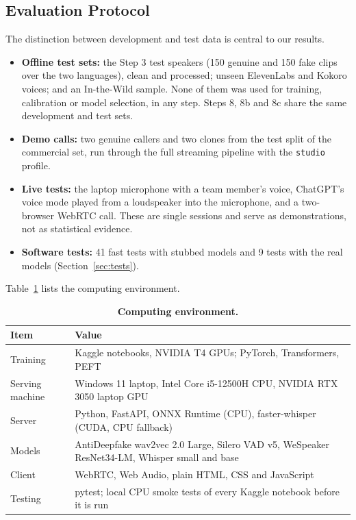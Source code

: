 \documentclass[10pt,a4paper,twocolumn]{article}
\begin{document}
\subsection{Evaluation Protocol}
The distinction between development and test data is central to our results.
\begin{itemize}\setlength\itemsep{0pt}
\item \textbf{Offline test sets:} the Step 3 test speakers (150 genuine and 150 fake clips over the two languages), clean and processed; unseen ElevenLabs and Kokoro voices; and an In-the-Wild sample. None of them was used for training, calibration or model selection, in any step. Steps 8, 8b and 8c share the same development and test sets.
\item \textbf{Demo calls:} two genuine callers and two clones from the test split of the commercial set, run through the full streaming pipeline with the \texttt{studio} profile.
\item \textbf{Live tests:} the laptop microphone with a team member's voice, ChatGPT's voice mode played from a loudspeaker into the microphone, and a two-browser WebRTC call. These are single sessions and serve as demonstrations, not as statistical evidence.
\item \textbf{Software tests:} 41 fast tests with stubbed models and 9 tests with the real models (Section~\ref{sec:tests}).
\end{itemize}
Table~\ref{tab:env} lists the computing environment.

\begin{table}[t]
\centering\footnotesize
\caption{\textbf{Computing environment.}}
\label{tab:env}
\begin{tabular}{@{}p{}p{}@{}}
\toprule
\textbf{Item} & \textbf{Value}\\
\midrule
Training & Kaggle notebooks, NVIDIA T4 GPUs; PyTorch, Transformers, PEFT\\
Serving machine & Windows 11 laptop, Intel Core i5-12500H CPU, NVIDIA RTX 3050 laptop GPU\\
Server & Python, FastAPI, ONNX Runtime (CPU), faster-whisper (CUDA, CPU fallback)\\
Models & AntiDeepfake wav2vec 2.0 Large, Silero VAD v5, WeSpeaker ResNet34-LM, Whisper small and base\\
Client & WebRTC, Web Audio, plain HTML, CSS and JavaScript\\
Testing & pytest; local CPU smoke tests of every Kaggle notebook before it is run\\
\bottomrule
\end{tabular}
\end{table}
\end{document}
